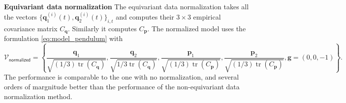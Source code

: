 \documentclass[accepted]{article}
\renewcommand{\mathcal}[1]{\mathscr{#1}} %
\begin{document}
\textbf{Equivariant data normalization}
The equivariant data normalization takes all the vectors $\{\mathbf q_1^{(i)}(t), \mathbf q_2^{(i)}(t)\}_{i,t}$ and computes their $3\times 3$ empirical covariance matrix $C_{\mathbf q}$. Similarly it computes $C_{\mathbf p}$. The normalized model uses the formulation \eqref{eq:model_pendulum} with 
\begin{equation}
    \mathcal V_\textsf{normalized} = \left\{\frac{\mathbf q_1}{\sqrt{(1/3)\operatorname{tr}(C_{\mathbf q})}}, \frac{\mathbf q_2}{\sqrt{{1/3}\operatorname{tr}(C_{\mathbf q})}}, \frac{\mathbf p_1}{\sqrt{(1/3)\operatorname{tr}(C_{\mathbf p})}}, \frac{\mathbf p_2}{\sqrt{(1/3)\operatorname{tr}(C_{\mathbf p})}}, \mathbf g=(0,0,-1)\right\}.
\end{equation}
The performance is comparable to the one with no normalization, and several orders of margnitude better than the performance of the non-equivariant data normalization method.
\end{document}
